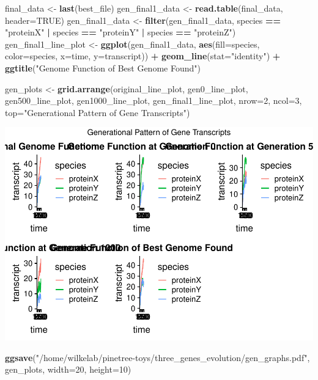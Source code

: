 \documentclass[]{article}
\newenvironment{Shaded}{\begin{snugshade}}{\end{snugshade}}
\newcommand{\DataTypeTok}[1]{\textcolor[rgb]{0.13,0.29,0.53}{#1}}
\newcommand{\DecValTok}[1]{\textcolor[rgb]{0.00,0.00,0.81}{#1}}
\newcommand{\KeywordTok}[1]{\textcolor[rgb]{0.13,0.29,0.53}{\textbf{#1}}}
\newcommand{\NormalTok}[1]{#1}
\newcommand{\OperatorTok}[1]{\textcolor[rgb]{0.81,0.36,0.00}{\textbf{#1}}}
\newcommand{\OtherTok}[1]{\textcolor[rgb]{0.56,0.35,0.01}{#1}}
\newcommand{\StringTok}[1]{\textcolor[rgb]{0.31,0.60,0.02}{#1}}
\begin{document}
\begin{Shaded}
\begin{Highlighting}[]
\NormalTok{final_data <-}\StringTok{ }\KeywordTok{last}\NormalTok{(best_file)}
\NormalTok{gen_final1_data <-}\StringTok{ }\KeywordTok{read.table}\NormalTok{(final_data, }\DataTypeTok{header=}\OtherTok{TRUE}\NormalTok{)}
\NormalTok{gen_final1_data <-}\StringTok{ }\KeywordTok{filter}\NormalTok{(gen_final1_data, species }\OperatorTok{==}\StringTok{ "proteinX"} \OperatorTok{|}\StringTok{ }\NormalTok{species }\OperatorTok{==}\StringTok{ "proteinY"} \OperatorTok{|}\StringTok{ }\NormalTok{species }\OperatorTok{==}\StringTok{ "proteinZ"}\NormalTok{)}
\NormalTok{gen_final1_line_plot <-}\StringTok{  }\KeywordTok{ggplot}\NormalTok{(gen_final1_data, }\KeywordTok{aes}\NormalTok{(}\DataTypeTok{fill=}\NormalTok{species, }\DataTypeTok{color=}\NormalTok{species, }\DataTypeTok{x=}\NormalTok{time, }\DataTypeTok{y=}\NormalTok{transcript)) }\OperatorTok{+}\StringTok{ }\KeywordTok{geom_line}\NormalTok{(}\DataTypeTok{stat=}\StringTok{"identity"}\NormalTok{) }\OperatorTok{+}\StringTok{ }\KeywordTok{ggtitle}\NormalTok{(}\StringTok{"Genome Function of Best Genome Found"}\NormalTok{)}

\NormalTok{gen_plots <-}\StringTok{ }\KeywordTok{grid.arrange}\NormalTok{(original_line_plot, gen0_line_plot, gen500_line_plot, gen1000_line_plot, gen_final1_line_plot, }\DataTypeTok{nrow=}\DecValTok{2}\NormalTok{, }\DataTypeTok{ncol=}\DecValTok{3}\NormalTok{, }\DataTypeTok{top=}\StringTok{"Generational Pattern of Gene Transcripts"}\NormalTok{)}
\end{Highlighting}
\end{Shaded}

\includegraphics{evolutionary_analysis_files/figure-latex/cars-1.pdf}

\begin{Shaded}
\begin{Highlighting}[]
\KeywordTok{ggsave}\NormalTok{(}\StringTok{"/home/wilkelab/pinetree-toys/three_genes_evolution/gen_graphs.pdf"}\NormalTok{, gen_plots, }\DataTypeTok{width=}\DecValTok{20}\NormalTok{, }\DataTypeTok{height=}\DecValTok{10}\NormalTok{)}
\end{Highlighting}
\end{Shaded}
\end{document}
